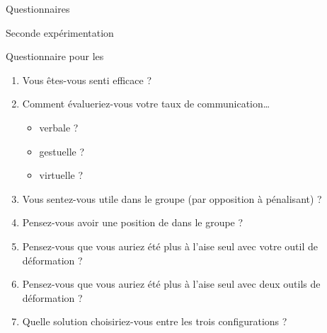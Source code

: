 \documentclass[myfrancais]{mythesis}
\begin{document}
\begin{mychapter}{Questionnaires}
\begin{mysection}{Seconde expérimentation}
\begin{mysubsection}{Questionnaire pour les }
\begin{enumerate}
					\item Vous êtes-vous senti efficace ?
					\item Comment évalueriez-vous votre taux de communication\dots{}
						\begin{itemize}
							\item verbale ?
							\item gestuelle ?
							\item virtuelle ?
						\end{itemize}
					\item Vous sentez-vous utile dans le groupe (par opposition à pénalisant) ?
					\item Pensez-vous avoir une position de  dans le groupe ?
					\item Pensez-vous que vous auriez été plus à l'aise seul avec votre outil de déformation ?
					\item Pensez-vous que vous auriez été plus à l'aise seul avec deux outils de déformation ?
					\item Quelle solution choisiriez-vous entre les trois configurations ?
				\end{enumerate}


\end{mysubsection}
\end{mysection}
\end{mychapter}
\end{document}
